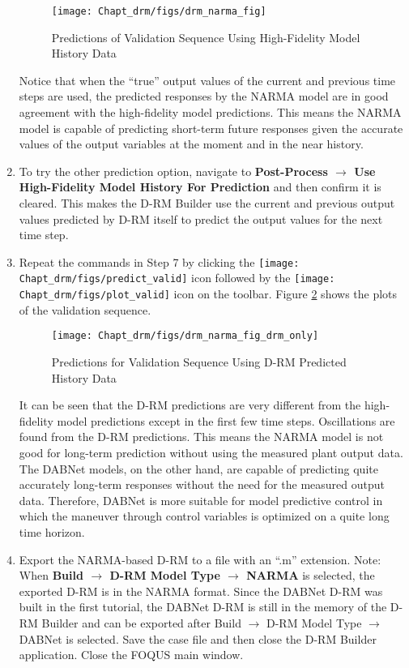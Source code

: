 \begin{enumerate}
	\begin{figure}[H]
		\begin{center}
			\texttt{[image: Chapt\_drm/figs/drm\_narma\_fig]}
			\caption{Predictions of Validation Sequence Using High-Fidelity Model History Data}
			\label{fig.drm_narma_fig}
		\end{center}
	\end{figure}
	Notice that when the ``true'' output values of the current and previous time steps are used, the predicted responses by the NARMA model are in good agreement with the 
	high-fidelity model predictions.  This means the NARMA model is capable of predicting short-term future responses given the accurate values of the output variables at the moment and in the near history.
	\item To try the other prediction option, navigate to \textbf{Post-Process $\rightarrow$ Use High-Fidelity Model History For Prediction} and then confirm it is cleared.  This makes the D-RM Builder use the current and previous output values predicted by D-RM itself to predict the output values for the next time step.
	\item Repeat the commands in Step 7 by clicking the \texttt{[image: Chapt\_drm/figs/predict\_valid]} icon followed by the \texttt{[image: Chapt\_drm/figs/plot\_valid]} icon on the toolbar.  Figure \ref{fig.drm_narma_fig_drm_only} shows the plots of the validation sequence.
	\begin{figure}[H]
		\begin{center}
			\texttt{[image: Chapt\_drm/figs/drm\_narma\_fig\_drm\_only]}
			\caption{Predictions for Validation Sequence Using D-RM Predicted History Data}
			\label{fig.drm_narma_fig_drm_only}
		\end{center}
	\end{figure}
	It can be seen that the D-RM predictions are very different from the high-fidelity model predictions except in the first few time steps.  Oscillations are found from the D-RM predictions.  This means the NARMA model is not good for long-term prediction without using the measured plant output data.  The DABNet models, on the other hand, are capable of predicting quite accurately long-term responses without the need for the measured output data.  Therefore, DABNet is more suitable for model predictive control in which the maneuver through control variables is optimized on a quite long time horizon.
	\item Export the NARMA-based D-RM to a file with an “.m” extension.  Note: When \textbf{Build $\rightarrow$ D-RM Model Type $\rightarrow$ NARMA} is selected, the exported D-RM is in the NARMA format.  Since the DABNet D-RM was built in the first tutorial, the DABNet D-RM is still in the memory of the D-RM Builder and can be exported after Build $\rightarrow$ D-RM Model Type $\rightarrow$ DABNet is selected.  Save the case file and then close the D-RM Builder application. Close the FOQUS main window.
\end{enumerate}


